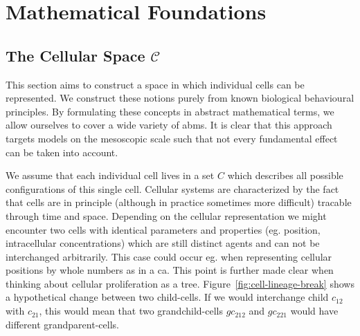 \section{Mathematical Foundations}
\subsection{The Cellular Space $\mathscr{C}$}
This section aims to construct a space in which individual cells can be represented.
We construct these notions purely from known biological behavioural principles.
By formulating these concepts in abstract mathematical terms, we allow ourselves to cover a wide
variety of \acp{abm}.
It is clear that this approach targets models on the mesoscopic scale such that not every
fundamental effect can be taken into account.

We assume that each individual cell lives in a set $C$ which describes all possible configurations
of this single cell.
Cellular systems are characterized by the fact that cells are in principle (although in
practice sometimes more difficult) tracable through time and space.
Depending on the cellular representation we might encounter two cells with identical parameters and
properties (eg. position, intracellular concentrations) which are still distinct agents and can not
be interchanged arbitrarily.
This case could occur eg. when representing cellular positions by whole numbers as in a
\ac{ca}.
This point is further made clear when thinking about cellular proliferation as a tree.
Figure~\ref{fig:cell-lineage-break} shows a hypothetical change between two child-cells.
If we would interchange child $c_{12}$ with $c_{21}$, this would mean that two grandchild-cells
$gc_{212}$ and $gc_{221}$ would have different grandparent-cells.

